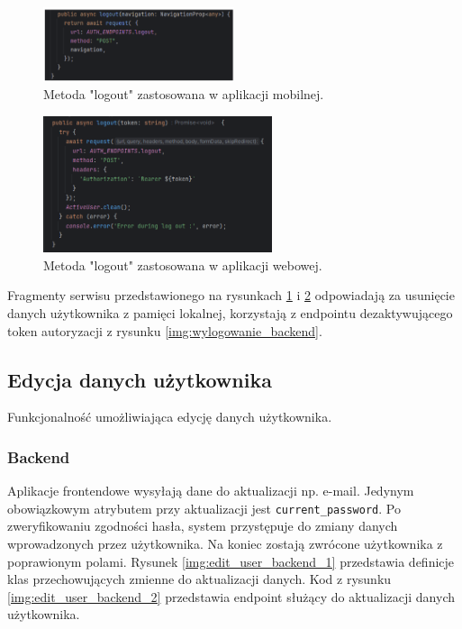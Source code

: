 \begin{figure}[H]
    \centering
    \includegraphics[width=0.5\textwidth]{chapters/chapter_8/screens/wylogowanie_mobile}
    \caption{Metoda "logout" zastosowana w aplikacji mobilnej.}
    \label{img:wylogowanie_mobile}
\end{figure}

\begin{figure}[H]
    \centering
    \includegraphics[width=0.6\textwidth]{chapters/chapter_8/screens/wylogowanie_web}
    \caption{Metoda "logout" zastosowana w aplikacji webowej.}
    \label{img:wylogowanie_web}
\end{figure}

Fragmenty serwisu przedstawionego na rysunkach \ref{img:wylogowanie_mobile} i \ref{img:wylogowanie_web} odpowiadają za usunięcie danych użytkownika z pamięci lokalnej, korzystają z endpointu dezaktywującego token autoryzacji z rysunku \ref{img:wylogowanie_backend}.

\subsection{Edycja danych użytkownika}
Funkcjonalność umożliwiająca edycję danych użytkownika.

\subsubsection{Backend}
Aplikacje frontendowe wysyłają dane do aktualizacji np. e-mail. Jedynym obowiązkowym atrybutem przy aktualizacji jest \texttt{current\_password}. Po zweryfikowaniu zgodności hasła, system przystępuje do zmiany danych wprowadzonych przez użytkownika. Na koniec zostają zwrócone użytkownika z poprawionym polami. Rysunek \ref{img:edit_user_backend_1} przedstawia definicje klas przechowujących zmienne do aktualizacji danych. Kod z rysunku \ref{img:edit_user_backend_2} przedstawia endpoint służący do aktualizacji danych użytkownika.


